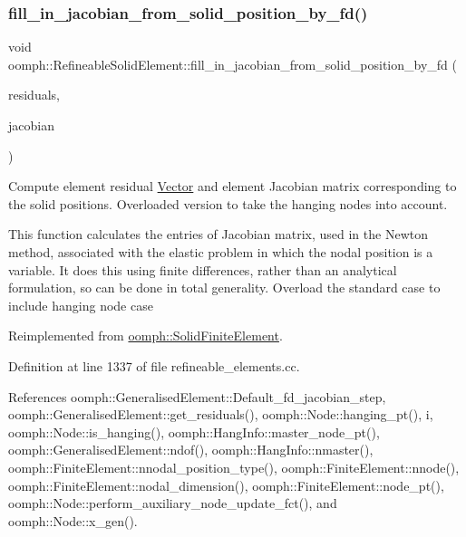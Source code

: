 \subsubsection{\texorpdfstring{fill\+\_\+in\+\_\+jacobian\+\_\+from\+\_\+solid\+\_\+position\+\_\+by\+\_\+fd()}{fill\_in\_jacobian\_from\_solid\_position\_by\_fd()}}
{\footnotesize\ttfamily void oomph\+::\+Refineable\+Solid\+Element\+::fill\+\_\+in\+\_\+jacobian\+\_\+from\+\_\+solid\+\_\+position\+\_\+by\+\_\+fd (\begin{DoxyParamCaption}\item[{\hyperlink{classoomph_1_1Vector}{Vector}$<$ double $>$ \&}]{residuals,  }\item[{\hyperlink{classoomph_1_1DenseMatrix}{Dense\+Matrix}$<$ double $>$ \&}]{jacobian }\end{DoxyParamCaption})\hspace{0.3cm}{\ttfamily [virtual]}}



Compute element residual \hyperlink{classoomph_1_1Vector}{Vector} and element Jacobian matrix corresponding to the solid positions. Overloaded version to take the hanging nodes into account. 

This function calculates the entries of Jacobian matrix, used in the Newton method, associated with the elastic problem in which the nodal position is a variable. It does this using finite differences, rather than an analytical formulation, so can be done in total generality. Overload the standard case to include hanging node case 

Reimplemented from \hyperlink{classoomph_1_1SolidFiniteElement_aa4d7dab326ceb0167da34ad4c535fa0d}{oomph\+::\+Solid\+Finite\+Element}.



Definition at line 1337 of file refineable\+\_\+elements.\+cc.



References oomph\+::\+Generalised\+Element\+::\+Default\+\_\+fd\+\_\+jacobian\+\_\+step, oomph\+::\+Generalised\+Element\+::get\+\_\+residuals(), oomph\+::\+Node\+::hanging\+\_\+pt(), i, oomph\+::\+Node\+::is\+\_\+hanging(), oomph\+::\+Hang\+Info\+::master\+\_\+node\+\_\+pt(), oomph\+::\+Generalised\+Element\+::ndof(), oomph\+::\+Hang\+Info\+::nmaster(), oomph\+::\+Finite\+Element\+::nnodal\+\_\+position\+\_\+type(), oomph\+::\+Finite\+Element\+::nnode(), oomph\+::\+Finite\+Element\+::nodal\+\_\+dimension(), oomph\+::\+Finite\+Element\+::node\+\_\+pt(), oomph\+::\+Node\+::perform\+\_\+auxiliary\+\_\+node\+\_\+update\+\_\+fct(), and oomph\+::\+Node\+::x\+\_\+gen().



